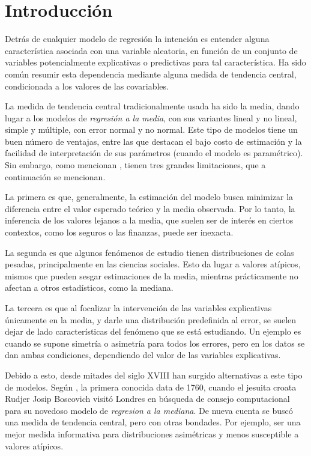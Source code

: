 \chapter{Introducci\'on}

Detr\'as de cualquier modelo de regresi\'on la intenci\'on es entender alguna caracter\'istica asociada con una variable aleatoria, en funci\'on de un conjunto de variables potencialmente explicativas o predictivas para tal caracter\'istica. Ha sido com\'un resumir esta dependencia mediante alguna medida de tendencia central, condicionada a los valores de las covariables.

La medida de tendencia central tradicionalmente usada ha sido la media, dando lugar a los modelos de \textit{regresi\'on a la media}, con sus variantes lineal y no lineal, simple y m\'ultiple, con error normal y no normal. Este tipo de modelos tiene un buen n\'umero de ventajas, entre las que destacan el bajo costo de estimaci\'on y la facilidad de interpretaci\'on de sus par\'ametros (cuando el modelo es param\'etrico). Sin embargo, como mencionan \cite{Hao_FrecQuantReg}, tienen tres grandes limitaciones, que a continuaci\'on se mencionan.

La primera es que, generalmente, la estimaci\'on del modelo busca minimizar la diferencia entre el valor esperado te\'orico y la media observada. Por lo tanto, la inferencia de los valores lejanos a la media, que suelen ser de inter\'es en ciertos contextos, como los seguros o las finanzas, puede ser inexacta.

La segunda es que algunos fen\'omenos de estudio tienen distribuciones de colas pesadas, principalmente en las ciencias sociales. Esto da lugar a valores at\'ipicos, mismos que pueden sesgar estimaciones de la media, mientras prácticamente no afectan a otros estadísticos, como la mediana.

La tercera es que al focalizar la intervenci\'on de las variables explicativas \'unicamente en la media, y darle una distribución predefinida al error, se suelen dejar de lado caracter\'isticas del fen\'omeno que se est\'a estudiando. Un ejemplo es cuando se supone simetr\'ia o asimetr\'ia para todos los errores, pero en los datos se dan ambas condiciones, dependiendo del valor de las variables explicativas. 

Debido a esto, desde mitades del siglo XVIII han surgido alternativas a este tipo de modelos. Seg\'un \cite{Hao_FrecQuantReg}, la primera conocida data de 1760, cuando el jesuita croata Rudjer Josip Boscovich visit\'o Londres en b\'usqueda de consejo computacional para su novedoso modelo de \textit{regresi\’on a la mediana}. De nueva cuenta se busc\'o una medida de tendencia central, pero con otras bondades. Por ejemplo, ser una mejor medida informativa para distribuciones asim\'etricas y menos susceptible a valores at\'ipicos. 


